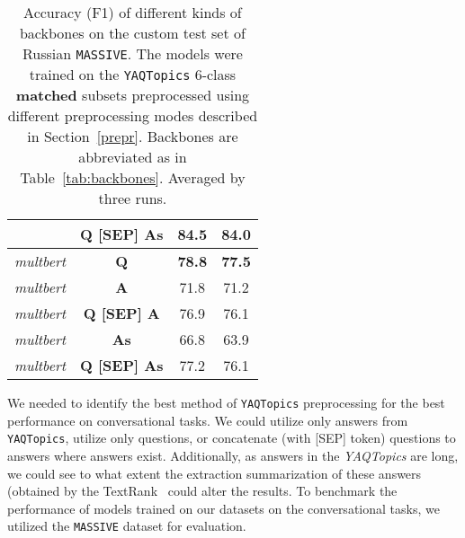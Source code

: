 \begin{table*}
{\begin{tabular}{|c|c||c|c|}
{\textit{rubert-tiny} &  \textbf{Q [SEP] As} & \textbf{84.5} & \textbf{84.0}\\ \hline \hline%
\textit{multbert} &  \textbf{Q} & \textbf{78.8} & \textbf{77.5}\\ \hline%
\textit{multbert} &  \textbf{A} & 71.8 & 71.2\\ \hline%
\textit{multbert} &  \textbf{Q [SEP] A} & 76.9 & 76.1\\ \hline%
\textit{multbert} &  \textbf{As} & 66.8 & 63.9\\ \hline%
\textit{multbert} &  \textbf{Q [SEP] As} & 77.2 & 76.1\\ \hline%
\end{tabular}
}
\caption{
 Accuracy (F1) of different kinds of backbones on the custom test set of Russian \texttt{MASSIVE}.
The models were trained on the \texttt{YAQTopics} 6-class \textbf{matched} subsets preprocessed using different preprocessing modes described in Section~\ref{prepr}. Backbones are abbreviated as in Table~\ref{tab:backbones}. Averaged by three runs.}
\label{tab:matched}
\end{table*}





We needed to identify the best method of \texttt{YAQTopics} preprocessing for the best performance on conversational tasks. We could utilize only answers from \texttt{YAQTopics}, utilize only questions, or concatenate (with [SEP] token) questions to answers where answers exist. Additionally, as answers in the \textit{YAQTopics} are long, we could see to what extent the extraction summarization of these answers (obtained by the TextRank~\cite{summarizer} could alter the results. To benchmark the performance of models trained on our datasets on the conversational tasks, we utilized the \texttt{MASSIVE} dataset for evaluation.


